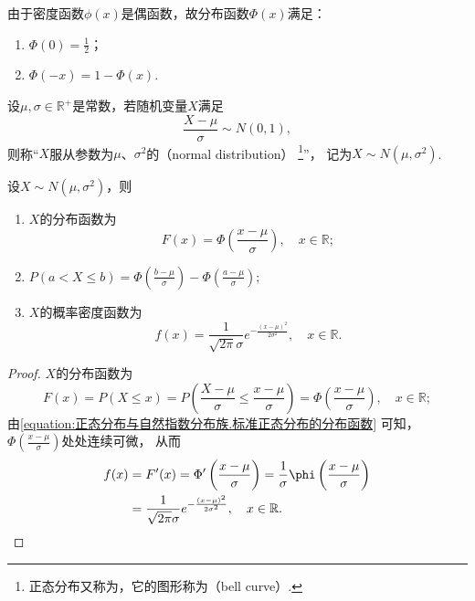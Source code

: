 \begin{property}
由于密度函数\(\phi(x)\)是偶函数，故分布函数\(\Phi(x)\)满足：
\begin{enumerate}
\item \(\Phi(0) = \frac{1}{2}\)；
\item \(\Phi(-x) = 1 - \Phi(x)\).
\end{enumerate}
\end{property}

\begin{definition}\label{definition:正态分布.正态分布的定义}
设\(\mu,\sigma\in\mathbb{R}^+\)是常数，若随机变量\(X\)满足\[
	\frac{X-\mu}{\sigma} \sim N(0,1),
\]
则称“\(X\)服从参数为\(\mu\)、\(\sigma^2\)的（normal distribution）%
\footnote{%
正态分布又称为，它的图形称为（bell curve）.
}”，
记为\(X \sim N(\mu,\sigma^2)\).
\end{definition}

\begin{theorem}
设\(X \sim N(\mu,\sigma^2)\)，则
\begin{enumerate}
	\item \(X\)的分布函数为\[
		F(x) = \Phi\left(\frac{x-\mu}{\sigma}\right),
		\quad x\in\mathbb{R};
	\]
	\item \(P(a < X \leq b) = \Phi\left(\frac{b-\mu}{\sigma}\right) - \Phi\left(\frac{a-\mu}{\sigma}\right)\);
	\item \(X\)的概率密度函数为\[
		f(x) = \frac{1}{\sqrt{2 \pi} \sigma} e^{-\frac{(x-\mu)^2}{2\sigma^2}},
		\quad x\in\mathbb{R}.
	\]
\end{enumerate}
\begin{proof}
\(X\)的分布函数为\[
	F(x) = P(X \leq x)
	= P\left(\frac{X-\mu}{\sigma}\leq\frac{x-\mu}{\sigma}\right)
	= \Phi\left(\frac{x-\mu}{\sigma}\right), \quad x\in\mathbb{R};
\]
由\cref{equation:正态分布与自然指数分布族.标准正态分布的分布函数} 可知，
\(\Phi\left(\frac{x-\mu}{\sigma}\right)\)处处连续可微，
从而\begin{align*}
	f(x) &= F'(x) = \Phi'\left(\frac{x-\mu}{\sigma}\right)
	= \frac{1}{\sigma} \phi\left(\frac{x-\mu}{\sigma}\right) \\
	&= \frac{1}{\sqrt{2 \pi} \sigma} e^{-\frac{(x-\mu)^2}{2\sigma^2}},
	\quad x\in\mathbb{R}.
	\qedhere
\end{align*}
\end{proof}
\end{theorem}

